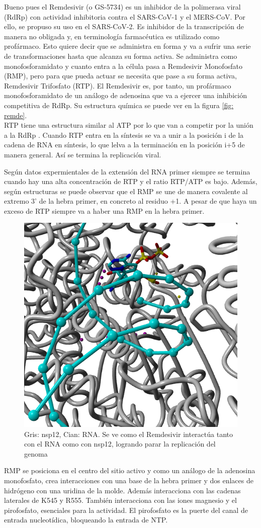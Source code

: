 \documentclass[a4paper,11pt]{report}
\begin{document}
 Bueno pues el Remdesivir (o GS-5734) es un inhibidor de la polimerasa viral (RdRp) con actividad inhibitoria contra el SARS-CoV-1 y el MERS-CoV. Por ello, se propuso su uso en el SARS-CoV-2. Es inhibidor de la transcripción de manera no obligada y, en terminología farmacéutica es utilizado como profármaco. Esto quiere decir que se administra en forma y va a sufrir una serie de transformaciones hasta que alcanza su forma activa. Se administra como monofosforamidato y cuanto entra a la célula pasa a Remdesivir Monofosfato (RMP), pero para que pueda actuar se necesita que pase a su forma activa, Remdesivir Trifosfato (RTP). El Remdesivir es, por tanto, un profármaco monofosforamidato de un análogo de adenosina que va a ejercer una inhibición competitiva de RdRp.
 Su estructura química se puede ver en la figura \ref{fig: remde}.  \\
  RTP tiene una estructura similar al ATP por lo que van a competir por la unión a la RdRp \cite{remde2}. Cuando RTP entra en la síntesis se va a unir a la posición i de la cadena de RNA en síntesis, lo que lelva a la terminación en la posición i+5 de manera general. Así se termina la replicación viral.
  
  Según datos expermientales de \cite{estremde} la extensión del RNA primer siempre se termina cuando hay una alta concentración de RTP y el ratio RTP/ATP es bajo. Además, según estructuras se puede observar que el RMP  se une de manera covalente al extremo 3' de la hebra primer, en concreto al residuo +1. A pesar de que haya un exceso de RTP siempre va a haber una RMP en la hebra primer.
  
  \begin{figure}
  	\centering
    \includegraphics[width=0.4\linewidth]{Figuras/Figura37}
  	\caption{Gris: nsp12, Cian: RNA. Se ve como el Remdesivir interactúa tanto con el RNA como con nsp12, logrando parar la replicación del genoma}
  \end{figure}
  
 
 RMP se posiciona en el centro del sitio activo y como un análogo de la adenosina monofosfato, crea interacciones con una base de la hebra primer y dos enlaces de hidrógeno con una uridina de la molde. Además interacciona con las cadenas laterales de K545 y R555. También interacciona con las iones magnesio y el pirofosfato, esenciales para la actividad. El pirofosfato es la puerte del canal de entrada nucleotídica, bloqueando la entrada de NTP. \cite{estremde}
 
\end{document}
